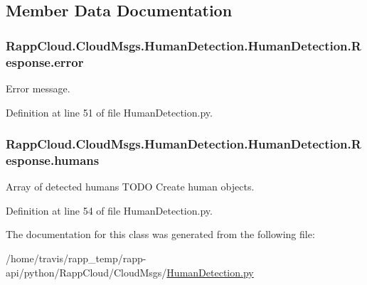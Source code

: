 \subsection{Member Data Documentation}
\hypertarget{classRappCloud_1_1CloudMsgs_1_1HumanDetection_1_1HumanDetection_1_1Response_a66be0c82c2d662f594dd35300df8dbac}{
\subsubsection[{error}]{\setlength{\rightskip}{0pt plus 5cm}Rapp\-Cloud.\-Cloud\-Msgs.\-Human\-Detection.\-Human\-Detection.\-Response.\-error}}\label{classRappCloud_1_1CloudMsgs_1_1HumanDetection_1_1HumanDetection_1_1Response_a66be0c82c2d662f594dd35300df8dbac}


Error message. 



Definition at line 51 of file Human\-Detection.\-py.

\hypertarget{classRappCloud_1_1CloudMsgs_1_1HumanDetection_1_1HumanDetection_1_1Response_a3d8df09b7a9f22271055557f1b450e32}{
\subsubsection[{humans}]{\setlength{\rightskip}{0pt plus 5cm}Rapp\-Cloud.\-Cloud\-Msgs.\-Human\-Detection.\-Human\-Detection.\-Response.\-humans}}\label{classRappCloud_1_1CloudMsgs_1_1HumanDetection_1_1HumanDetection_1_1Response_a3d8df09b7a9f22271055557f1b450e32}


Array of detected humans T\-O\-D\-O Create human objects. 



Definition at line 54 of file Human\-Detection.\-py.



The documentation for this class was generated from the following file\-:\begin{DoxyCompactItemize}
\item 
/home/travis/rapp\-\_\-temp/rapp-\/api/python/\-Rapp\-Cloud/\-Cloud\-Msgs/\hyperlink{HumanDetection_8py}{Human\-Detection.\-py}\end{DoxyCompactItemize}
